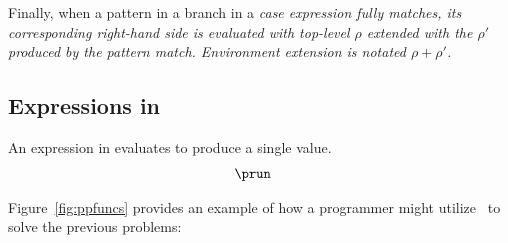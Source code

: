 \documentclass[manuscript,screen,review, 12pt, nonacm]{acmart}
\begin{document}
Finally, when a pattern in a branch in a \it{case} expression fully matches, its
corresponding right-hand side is evaluated with top-level $\rho$ extended with
the $\rho'$ produced by the pattern match. Environment extension is notated
$\rho + \rho'$. 

\subsection{Expressions in \PPlus}

    An expression in {\PPlus} evaluates to produce a single value. 
    \begin{align*}
        &\prun
    \end{align*}
    
    \ppsemantics 
      
      \bigskip 

    
    Figure~\ref{fig:ppfuncs} provides an example of how a programmer might utilize
    \PPlus\ to solve the previous problems: 
\end{document}
